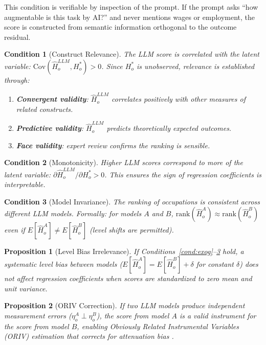 \documentclass[11pt,a4paper]{article}
\newtheorem{proposition}{Proposition}
\newtheorem{condition}{Condition}
\theoremstyle{definition}
\begin{document}
This condition is verifiable by inspection of the prompt. If the prompt asks ``how augmentable is this task by AI?'' and never mentions wages or employment, the score is constructed from semantic information orthogonal to the outcome residual.

\begin{condition}[Construct Relevance]
\label{cond:relevance}
The LLM score is correlated with the latent variable: $\text{Cov}(\hat{H}^{LLM}_o, H^*_o) > 0$. Since $H^*_o$ is unobserved, relevance is established through:
\begin{enumerate}[leftmargin=*]
\item \textbf{Convergent validity}: $\hat{H}^{LLM}_o$ correlates positively with other measures of related constructs.
\item \textbf{Predictive validity}: $\hat{H}^{LLM}_o$ predicts theoretically expected outcomes.
\item \textbf{Face validity}: expert review confirms the ranking is sensible.
\end{enumerate}
\end{condition}

\begin{condition}[Monotonicity]
\label{cond:mono}
Higher LLM scores correspond to more of the latent variable: $\partial \hat{H}^{LLM}_o / \partial H^*_o > 0$. This ensures the sign of regression coefficients is interpretable.
\end{condition}

\begin{condition}[Model Invariance]
\label{cond:invariance}
The ranking of occupations is consistent across different LLM models. Formally: for models $A$ and $B$, $\text{rank}(\hat{H}^A_o) \approx \text{rank}(\hat{H}^B_o)$ even if $E[\hat{H}^A_o] \neq E[\hat{H}^B_o]$ (level shifts are permitted).
\end{condition}

\begin{proposition}[Level Bias Irrelevance]
\label{prop:level}
If Conditions~\ref{cond:exog}--\ref{cond:invariance} hold, a systematic level bias between models ($E[\hat{H}^A_o] = E[\hat{H}^B_o] + \delta$ for constant $\delta$) does not affect regression coefficients when scores are standardized to zero mean and unit variance.
\end{proposition}

\begin{proposition}[ORIV Correction]
\label{prop:oriv}
If two LLM models produce independent measurement errors ($\eta^A_o \perp \eta^B_o$), the score from model $A$ is a valid instrument for the score from model $B$, enabling Obviously Related Instrumental Variables (ORIV) estimation that corrects for attenuation bias \citep{gillen2019experiment}.
\end{proposition}
\end{document}
